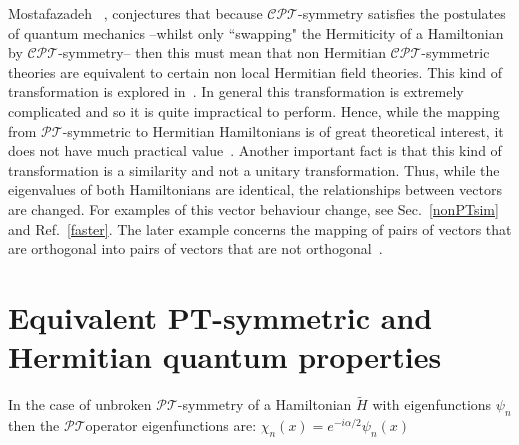 \documentclass[12pt, a4paper]{report}
\newcommand\PT{\(\mathcal{PT}\)}
\newcommand\CPT{\(\mathcal{CPT}\)}
\begin{document}
Mostafazadeh ~\cite{Mostafazadeh}, conjectures that because \CPT-symmetry satisfies the postulates of quantum mechanics --whilst only ``swapping" the Hermiticity of a Hamiltonian by \CPT-symmetry-- then this must mean that non Hermitian \CPT-symmetric theories are equivalent to certain non local Hermitian field theories. This kind of transformation is explored in~\cite{Mostafazadeh, EquivalentHH, Pseudo-HermiticityIII, Jones_2005,taleof2potentials}.
In general this transformation is extremely complicated and so it is quite impractical to perform. Hence, while the mapping from \PT-symmetric to Hermitian Hamiltonians is of great theoretical interest, it does not have much practical value~\cite{MakingSense}. Another important fact is that this kind of transformation is a similarity and not a unitary transformation. Thus, while the eigenvalues of both Hamiltonians are identical, the relationships between vectors are changed. For examples of this vector behaviour change, see Sec.~\ref{nonPTsim} and Ref.~\ref{faster}. The later example concerns the mapping of pairs of vectors that are orthogonal into pairs of vectors that are not orthogonal~\cite{MakingSense, Bender_2007}.

\section{Equivalent PT-symmetric and Hermitian quantum properties}\label{Dict}
In the case of unbroken \PT-symmetry of a Hamiltonian $\tilde{H}$ with eigenfunctions $\psi_n$ then the \PT\:operator eigenfunctions are: $\chi_{n}(x) = e^{-i\alpha/2}\psi_n(x)$\\
\end{document}
